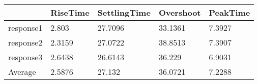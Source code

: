 \begin{tabular}{lllll}
  & RiseTime & SettlingTime & Overshoot & PeakTime \\ 
\hline 
response1 & 2.803 & 27.7096 & 33.1361 & 7.3927 \\ 
response2 & 2.3159 & 27.0722 & 38.8513 & 7.3907 \\ 
response3 & 2.6438 & 26.6143 & 36.229 & 6.9031 \\ 
Average & 2.5876 & 27.132 & 36.0721 & 7.2288 \\ 
\hline 
\end{tabular}